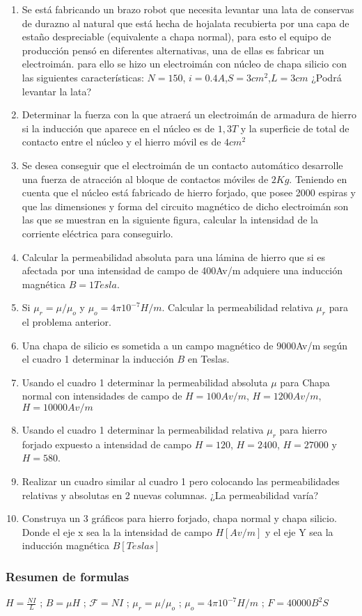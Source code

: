 \documentclass[a4paper]{article}
\begin{document}
\begin{enumerate}
    \item Se está fabricando un brazo robot que necesita levantar una lata de conservas de durazno al natural que está hecha de hojalata recubierta por una capa de estaño despreciable (equivalente a chapa normal), para esto el equipo de producción pensó en diferentes alternativas, una de ellas es fabricar un electroimán. para ello se hizo un electroimán con núcleo de chapa silicio con las siguientes características: $N=150$, $i=0.4A$,$S=3cm^2$,$L=3cm$ ¿Podrá levantar la lata?
    \item Determinar la fuerza con la que atraerá un electroimán de armadura de hierro si la inducción que aparece en el núcleo es de $1,3T$ y la superficie de total de contacto entre el núcleo y el hierro móvil es de $4cm^2$ 
    \item Se desea conseguir que el electroimán de un contacto automático desarrolle una fuerza de atracción al bloque de contactos móviles de $2Kg$. Teniendo en cuenta que el núcleo está fabricado de hierro forjado, que posee 2000 espiras y que las dimensiones y forma del circuito magnético de dicho electroimán son las que se muestran en la siguiente figura, calcular la intensidad de la corriente eléctrica para conseguirlo. 
    \item Calcular la permeabilidad absoluta para una lámina de hierro que si es afectada por una intensidad de campo de 400Av/m adquiere una inducción magnética $B=1Tesla$.
    \item Si  $\mu_r=\mu/\mu_o$ y $\mu_o= 4\pi10^{-7}H/m$. Calcular la permeabilidad relativa $\mu_r$ para el problema anterior.
    \item Una chapa de silicio es sometida a un campo magnético de 9000Av/m según el cuadro 1 determinar la inducción $B$ en Teslas.
    \item Usando el cuadro 1 determinar la permeabilidad absoluta $\mu$ para Chapa normal con intensidades de campo de $H=100Av/m$, $H=1200Av/m$, $H=10000Av/m$
    \item Usando el cuadro 1 determinar la permeabilidad relativa $\mu_r$ para hierro forjado expuesto a intensidad de campo $H=120$, $H=2400$, $H=27000$ y $H=580$.
    \item Realizar un cuadro similar al cuadro 1 pero colocando las permeabilidades relativas y absolutas en 2 nuevas columnas. ¿La permeabilidad varía?
    \item Construya un  3 gráficos para hierro forjado, chapa normal y chapa silicio. Donde el eje x sea la la intensidad de campo $H[Av/m]$ y el eje Y sea la inducción magnética $B[Teslas]$
\end{enumerate}
\subsubsection{Resumen de formulas}
$ H=\frac{NI}{L}$ ; $ B=\mu H$ ; $\mathcal{F}=NI$ ;  $\mu_r=\mu/\mu_o$ ; $\mu_o= 4\pi10^{-7}H/m$ ; $ F = 40000 B^2 S$
\end{document}
